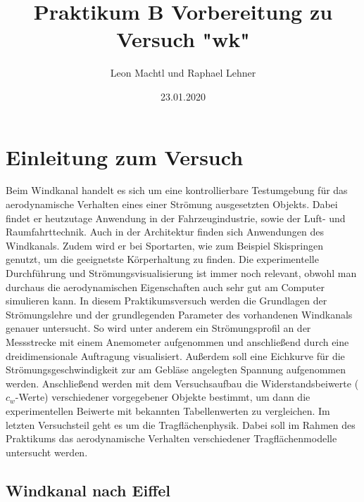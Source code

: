 \documentclass[a4paper,10pt]{scrartcl}
\title{Praktikum B Vorbereitung zu Versuch "wk"}
\author{Leon Machtl und Raphael Lehner}
\date{23.01.2020}
\begin{document}
	\maketitle
	\tableofcontents
	\newpage
	
	
	
	


	
	\section{Einleitung zum Versuch}
		Beim Windkanal handelt es sich um eine kontrollierbare Testumgebung für das aerodynamische Verhalten eines einer Strömung ausgesetzten Objekts. Dabei findet er heutzutage Anwendung in der Fahrzeugindustrie, sowie der Luft- und Raumfahrttechnik. Auch in der Architektur finden sich Anwendungen des Windkanals. Zudem wird er bei Sportarten, wie zum Beispiel Skispringen genutzt, um die geeignetste Körperhaltung zu finden. Die experimentelle Durchführung und Strömungsvisualisierung ist immer noch relevant, obwohl man durchaus die aerodynamischen Eigenschaften auch sehr gut am Computer simulieren kann.
		In diesem Praktikumsversuch werden die Grundlagen der Strömungslehre und der grundlegenden Parameter des vorhandenen Windkanals genauer untersucht. So wird unter anderem ein Strömungsprofil an der
		Messstrecke mit einem Anemometer aufgenommen und anschließend durch eine dreidimensionale Auftragung visualisiert. Außerdem soll eine Eichkurve für die Strömungsgeschwindigkeit zur am Gebläse angelegten Spannung aufgenommen werden. Anschließend werden mit dem Versuchsaufbau die Widerstandsbeiwerte (\(c_{w}\)-Werte) verschiedener vorgegebener Objekte bestimmt, um dann die experimentellen Beiwerte mit bekannten Tabellenwerten zu vergleichen. Im letzten Versuchsteil geht es um die Tragflächenphysik. Dabei soll im Rahmen des Praktikums das aerodynamische Verhalten verschiedener Tragflächenmodelle untersucht werden.
		
		\subsection{Windkanal nach Eiffel}
		
\end{document}

